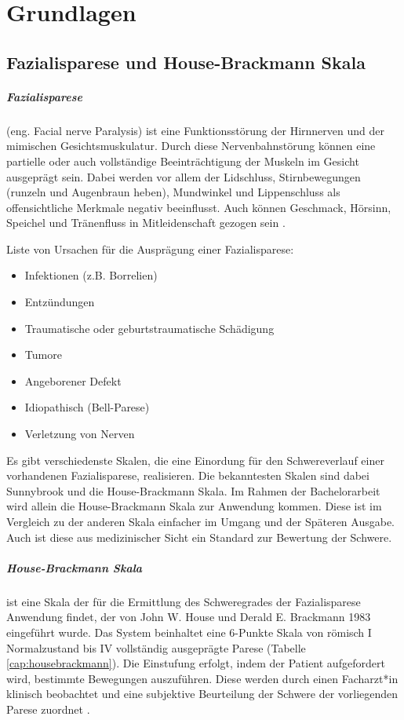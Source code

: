 


\chapter{Grundlagen}\label{basics}
\section{Fazialisparese und House-Brackmann Skala}\label{facialpalsy}
\paragraph{Fazialisparese} (eng. Facial nerve Paralysis) ist eine Funktionsstörung der Hirnnerven und der mimischen Gesichtsmuskulatur. Durch diese Nervenbahnstörung können eine partielle oder auch vollständige Beeinträchtigung der Muskeln im Gesicht ausgeprägt sein. Dabei werden vor allem der Lidschluss, Stirnbewegungen (runzeln und Augenbraun heben), Mundwinkel und Lippenschluss als offensichtliche Merkmale negativ beeinflusst. Auch können Geschmack, Hörsinn, Speichel und Tränenfluss in Mitleidenschaft gezogen sein \cite{facialpalsy_1}\cite{facialpalsy_2}.

Liste von Ursachen für die Ausprägung einer Fazialisparese:
\begin{itemize}
  \setlength\itemsep{-0.5em}
\item Infektionen (z.B. Borrelien)
\item Entzündungen
\item Traumatische oder geburtstraumatische
Schädigung
\item Tumore
\item Angeborener Defekt
\item Idiopathisch (Bell-Parese)
\item Verletzung von Nerven
\end{itemize}

Es gibt verschiedenste Skalen, die eine Einordung für den Schwereverlauf einer vorhandenen Fazialisparese, realisieren. Die bekanntesten Skalen sind dabei Sunnybrook und die House-Brackmann Skala. Im Rahmen der Bachelorarbeit wird allein die House-Brackmann Skala zur Anwendung kommen. Diese ist im Vergleich zu der anderen Skala einfacher im Umgang und der Späteren Ausgabe. Auch ist diese aus medizinischer Sicht ein Standard zur Bewertung der Schwere.




\paragraph{House-Brackmann Skala} ist eine Skala der für die Ermittlung des Schweregrades der Fazialisparese Anwendung findet, der von John W. House und Derald E. Brackmann 1983 eingeführt wurde. Das System beinhaltet eine 6-Punkte Skala von römisch I Normalzustand bis IV vollständig ausgeprägte Parese (Tabelle \ref{cap:housebrackmann}). Die Einstufung erfolgt, indem der Patient aufgefordert wird, bestimmte Bewegungen auszuführen. Diese werden durch einen Facharzt*in klinisch beobachtet und eine subjektive Beurteilung der Schwere der vorliegenden Parese zuordnet \cite{housebrackmann}.

